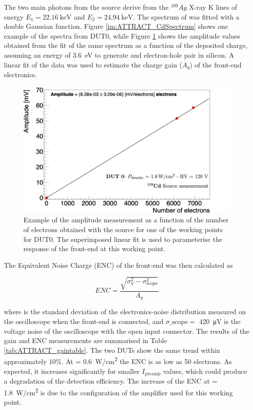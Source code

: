 		The two main photons from the \Cd source derive from the $ ^{109}Ag $ X-ray K lines of energy $E_{1} = \SI{22.16}{\kilo\electronvolt}$ and $E_{2} = \SI{24.94}{\kilo\electronvolt} $.
		The spectrum of \Cd was fitted with a double Gaussian function. Figure \ref{im:ATTRACT_CdSpectrum} shows one example of the spectra from DUT0, while Figure \ref{im:ATTRACT_CdFit} shows the amplitude values obtained from the fit of the same spectrum as a function of the deposited charge, assuming an energy of \SI{3.6}{\electronvolt} to generate and electron-hole pair in silicon. A linear fit of the data was used to estimate the charge gain ($ A_q $) of the front-end electronics. 
		
		
		\begin{figure}[h]
			\centering
			\includegraphics[width=0.8\linewidth]{files/ATTRACT_paper/Calibration_DUT0_120V_150uA}
			\caption{Example of the amplitude measurement as a function of the number of electrons obtained with the \Cd source for one of the working points for DUT0. The superimposed linear fit  is used to parameterise  the response of the front-end at this working point.}
			\label{im:ATTRACT_CdFit}
		\end{figure}

		The Equivalent Noise Charge (ENC) of the front-end was then calculated as

		\vspace{-3mm}
		\begin{equation*}
			ENC = \frac{\sqrt{\sigma_V^2-\sigma_{\text{scope}}^2}}{A_q}
		\end{equation*}

		\vspace{-1mm}
		where \noise is the standard deviation of the electronics-noise distribution measured on the oscilloscope when the front-end is connected, and $\sigma\_{\text{scope}} =$ \SI{420}{\micro\volt} is the voltage noise of the oscilloscope with the open input connector. The results of the gain and ENC measurements are summarised in Table \ref{tab:ATTRACT_gaintable}. The two DUTs show the same trend within approximately 10\%. At  \power = \SI{0.6}{\watt/\centi\meter^2} the ENC is as low as 50 electrons. As expected, it increases significantly for smaller $ I_{\text{preamp}} $ values, which could produce a degradation of the detection efficiency. The increase of the ENC at \power =  \SI{1.8}{\watt/\centi\meter^2} is due to the configuration of the amplifier used for this working point.

